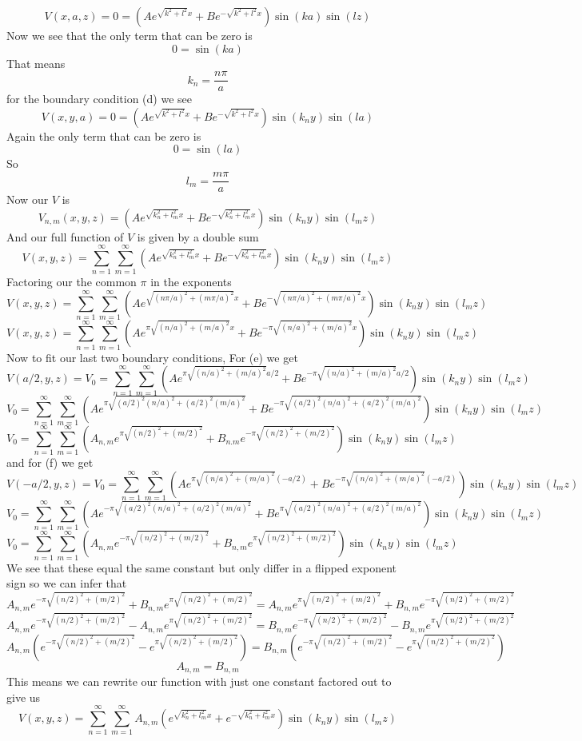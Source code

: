 \documentclass[11pt]{article}
\numberwithin{equation}{section}
\begin{document}
$$V(x,a,z) = 0 = \left(Ae^{\sqrt{k^2+l^2}x}+Be^{-\sqrt{k^2+l^2}x}\right)\sin(ka)\sin(lz)$$
Now we see that the only term that can be zero is
$$0=\sin(ka)$$
That means 
$$k_n = \frac{n\pi}{a}$$
for the boundary condition (d) we see
$$V(x,y,a) = 0 = \left(Ae^{\sqrt{k^2+l^2}x}+Be^{-\sqrt{k^2+l^2}x}\right)\sin(k_ny)\sin(la)$$
Again the only term that can be zero is
$$0=\sin(la)$$
So 
$$l_m = \frac{m\pi}{a}$$
Now our $V$ is 
$$V_{n,m}(x,y,z) = \left(Ae^{\sqrt{k_n^2+l_m^2}x}+Be^{-\sqrt{k_n^2+l_m^2}x}\right)\sin(k_ny)\sin(l_mz)$$
And our full function of $V$ is given by a double sum
$$V(x,y,z) = \sum_{n=1}^{\infty}\sum_{m=1}^{\infty}\left(Ae^{\sqrt{k_n^2+l_m^2}x}+Be^{-\sqrt{k_n^2+l_m^2}x}\right)\sin(k_ny)\sin(l_mz)$$
Factoring our the common $\pi$ in the exponents 
$$V(x,y,z) = \sum_{n=1}^{\infty}\sum_{m=1}^{\infty}\left(Ae^{\sqrt{(n\pi/a)^2+(m\pi/a)^2}x}+Be^{-\sqrt{(n\pi/a)^2+(m\pi/a)^2}x}\right)\sin(k_ny)\sin(l_mz)$$
$$V(x,y,z) = \sum_{n=1}^{\infty}\sum_{m=1}^{\infty}\left(Ae^{\pi\sqrt{(n/a)^2+(m/a)^2}x}+Be^{-\pi\sqrt{(n/a)^2+(m/a)^2}x}\right)\sin(k_ny)\sin(l_mz)$$
Now to fit our last two boundary conditions, For (e) we get
$$V(a/2,y,z) = V_0 = \sum_{n=1}^{\infty}\sum_{m=1}^{\infty}\left(Ae^{\pi\sqrt{(n/a)^2+(m/a)^2}a/2}+Be^{-\pi\sqrt{(n/a)^2+(m/a)^2}a/2}\right)\sin(k_ny)\sin(l_mz)$$
$$V_0 = \sum_{n=1}^{\infty}\sum_{m=1}^{\infty}\left(Ae^{\pi\sqrt{(a/2)^2(n/a)^2+(a/2)^2(m/a)^2}}+Be^{-\pi\sqrt{(a/2)^2(n/a)^2+(a/2)^2(m/a)^2}}\right)\sin(k_ny)\sin(l_mz)$$
$$V_0 = \sum_{n=1}^{\infty}\sum_{m=1}^{\infty}\left(A_{n,m}e^{\pi\sqrt{(n/2)^2+(m/2)^2}}+B_{n.m}e^{-\pi\sqrt{(n/2)^2+(m/2)^2}}\right)\sin(k_ny)\sin(l_mz)$$
and for (f) we get
$$V(-a/2,y,z) = V_0 = \sum_{n=1}^{\infty}\sum_{m=1}^{\infty}\left(Ae^{\pi\sqrt{(n/a)^2+(m/a)^2}(-a/2)}+Be^{-\pi\sqrt{(n/a)^2+(m/a)^2}(-a/2)}\right)\sin(k_ny)\sin(l_mz)$$
$$V_0 = \sum_{n=1}^{\infty}\sum_{m=1}^{\infty}\left(Ae^{-\pi\sqrt{(a/2)^2(n/a)^2+(a/2)^2(m/a)^2}}+Be^{\pi\sqrt{(a/2)^2(n/a)^2+(a/2)^2(m/a)^2}}\right)\sin(k_ny)\sin(l_mz)$$
$$V_0 = \sum_{n=1}^{\infty}\sum_{m=1}^{\infty}\left(A_{n,m}e^{-\pi\sqrt{(n/2)^2+(m/2)^2}}+B_{n,m}e^{\pi\sqrt{(n/2)^2+(m/2)^2}}\right)\sin(k_ny)\sin(l_mz)$$
We see that these equal the same constant but only differ in a flipped exponent sign so we can infer that
$$A_{n,m}e^{-\pi\sqrt{(n/2)^2+(m/2)^2}}+B_{n,m}e^{\pi\sqrt{(n/2)^2+(m/2)^2}}=A_{n,m}e^{\pi\sqrt{(n/2)^2+(m/2)^2}}+B_{n,m}e^{-\pi\sqrt{(n/2)^2+(m/2)^2}}$$
$$A_{n,m}e^{-\pi\sqrt{(n/2)^2+(m/2)^2}}-A_{n,m}e^{\pi\sqrt{(n/2)^2+(m/2)^2}}=B_{n,m}e^{-\pi\sqrt{(n/2)^2+(m/2)^2}}-B_{n,m}e^{\pi\sqrt{(n/2)^2+(m/2)^2}}$$
$$A_{n,m}\left(e^{-\pi\sqrt{(n/2)^2+(m/2)^2}}-e^{\pi\sqrt{(n/2)^2+(m/2)^2}}\right)=B_{n,m}\left(e^{-\pi\sqrt{(n/2)^2+(m/2)^2}}-e^{\pi\sqrt{(n/2)^2+(m/2)^2}}\right)$$
$$A_{n,m}= B_{n,m}$$
This means we can rewrite our function with just one constant factored out to give us
$$V(x,y,z) = \sum_{n=1}^{\infty}\sum_{m=1}^{\infty}A_{n,m}\left(e^{\sqrt{k_n^2+l_m^2}x}+e^{-\sqrt{k_n^2+l_m^2}x}\right)\sin(k_ny)\sin(l_mz)$$
\end{document}
